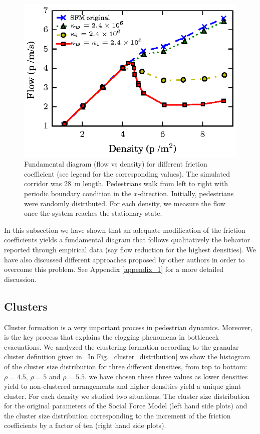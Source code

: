 \begin{figure}[htbp!]
\includegraphics[width=\columnwidth]
{plots/flow-density_pasillo22m_fgmodified_multi.eps}
\caption{\label{fgmodified-w22} Fundamental diagram (flow vs density) for different friction coefficient (see legend for the corresponding values). The simulated corridor was 28~m length. Pedestrians walk from left to right with periodic boundary condition in the $x$-direction. Initially, pedestrians were randomly distributed. For each density, we measure the flow once the system reaches the stationary state.}
\end{figure}

In this subsection we have shown that an adequate modification of the friction coefficients yields a fundamental diagram that follows qualitatively the behavior reported through empirical data (say flow reduction for the highest densities). We have also discussed different approaches proposed by other authors in order to overcome this problem. See Appendix \ref{appendix_1} for a more detailed discussion.\\

\subsection{\label{clusters}Clusters}

Cluster formation is a very important process in pedestrian dynamics. Moreover, is the key process that explains the clogging phenomena in bottleneck evacuations. We analyzed the clustering formation according to the granular cluster definition given in~\cite{Dorso1}
In Fig.~\ref{cluster_distribution} we show the histogram of the cluster size distribution for three different densities, from top to bottom: $\rho=4.5$, $\rho=5$ and $\rho=5.5$. we have chosen these three values as lower densities yield to non-clustered arrangements and higher densities yield a unique giant cluster.     
For each density we studied two situations. The cluster size distribution for the original parameters of the Social Force Model (left hand side plots) and the cluster size distribution corresponding to the increment of the friction coefficients by a factor of ten (right hand side plots).\\

